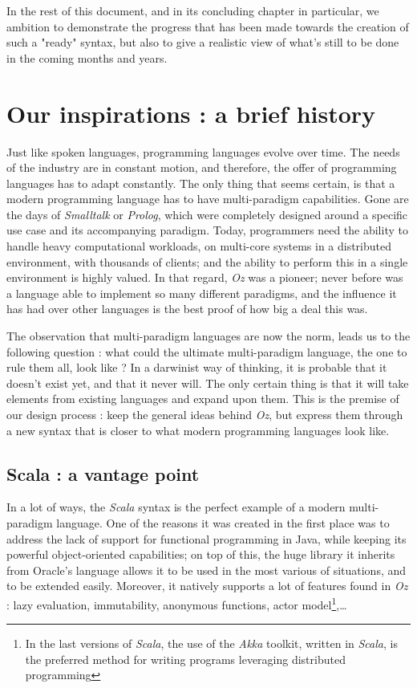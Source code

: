 In the rest of this document, and in its concluding chapter in particular, we ambition to demonstrate the progress that has been made towards the creation of such a "ready" syntax, but also to give a realistic view of what's still to be done in the coming months and years.

\section{Our inspirations : a brief history}\label{sec:ch1-inspiration}
Just like spoken languages, programming languages evolve over time.
The needs of the industry are in constant motion, and therefore, the offer of programming languages has to adapt constantly.
The only thing that seems certain, is that a modern programming language has to have multi-paradigm capabilities.
Gone are the days of \textit{Smalltalk} or \textit{Prolog}, which were completely designed around a specific use case and its accompanying paradigm.
Today, programmers need the ability to handle heavy computational workloads, on multi-core systems in a distributed environment, with thousands of clients;
and the ability to perform this in a single environment is highly valued.
In that regard, \textit{Oz} was a pioneer;
never before was a language able to implement so many different paradigms, and the influence it has had over other languages is the best proof of how big a deal this was.\newline

The observation that multi-paradigm languages are now the norm, leads us to the following question : what could the ultimate multi-paradigm language, the one to rule them all, look like ?
In a darwinist way of thinking, it is probable that it doesn't exist yet, and that it never will.
The only certain thing is that it will take elements from existing languages and expand upon them.
This is the premise of our design process : keep the general ideas behind \textit{Oz}, but express them through a new syntax that is closer to what modern programming languages look like.

\subsection{Scala : a vantage point}\label{subsec:ch1-scala}
In a lot of ways, the \textit{Scala} syntax is the perfect example of a modern multi-paradigm language.
One of the reasons it was created in the first place was to address the lack of support for functional programming in Java, while keeping its powerful object-oriented capabilities;
on top of this, the huge library it inherits from Oracle's language allows it to be used in the most various of situations, and to be extended easily.
Moreover, it natively supports a lot of features found in \textit{Oz} : lazy evaluation, immutability, anonymous functions, actor model\footnote{In the last versions of \textit{Scala}, the use of the \textit{Akka} toolkit\cite{akka}, written in \textit{Scala}, is the preferred method for writing programs leveraging distributed programming},\ldots\newline

